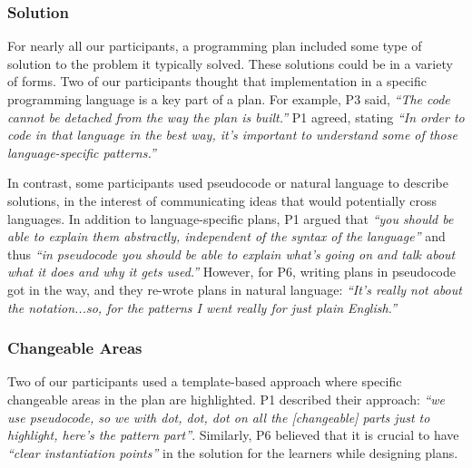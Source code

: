 \subsubsection{Solution}
\label{sec:solution}
For nearly all our participants, a programming plan included some type of solution to the problem it typically solved.
These solutions could be in a variety of forms. Two of our participants thought that implementation in a specific programming language is a key part of a plan. For example, P3 said, \textit{``The code cannot be detached from the way the plan is built.''} P1 agreed, stating \textit{``In order to code in that language in the best way, it's important to understand some of those language-specific patterns.''} 

In contrast, some participants used pseudocode or natural language to describe solutions, in the interest of communicating ideas that would potentially cross languages. In addition to language-specific plans, P1 argued that \textit{``you should be able to explain them abstractly, independent of the syntax of the language''} 
and thus \textit{``in pseudocode you should be able to explain what's going on and talk about what it does and why it gets used.''} However, for P6, writing plans in pseudocode got in the way, and they re-wrote plans in natural language: \textit{``It's really not about the notation...so, for the patterns I went really for just plain English.''}

\subsubsection{Changeable Areas}
\label{sec:changeable}
Two of our participants used a template-based approach where specific changeable areas in the plan are highlighted. P1 described their approach: \textit{``we use pseudocode, so we with dot, dot, dot on all the [changeable] parts just to highlight, here's the pattern part''}. Similarly, P6 believed that it is crucial to have \textit{``clear instantiation points''} in the solution for the learners while designing plans. %


